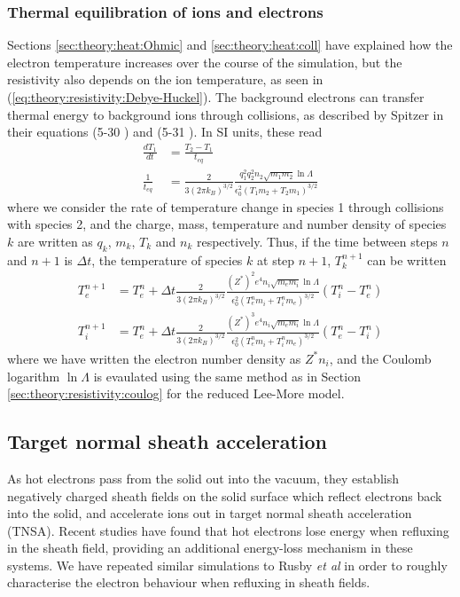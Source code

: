 \documentclass[12pt]{article}
\numberwithin{equation}{section}
\begin{document}
\subsubsection{Thermal equilibration of ions and electrons} \label{sec:theory:heat:ion}

Sections \ref{sec:theory:heat:Ohmic} and \ref{sec:theory:heat:coll} have explained how the electron temperature increases over the course of the simulation, but the resistivity also depends on the ion temperature, as seen in (\ref{eq:theory:resistivity:Debye-Huckel}). The background electrons can transfer thermal energy to background ions through collisions, as described by Spitzer \cite{theory:thermalEquil:Spitzer} in their equations (5-30 \cite{theory:thermalEquil:Spitzer}) and (5-31 \cite{theory:thermalEquil:Spitzer}). In SI units, these read
%
\begin{align}
  \frac{dT_1}{dt} &= \frac{T_2 - T_1}{t_{eq}}
  \\
  \frac{1}{t_{eq}} &= \frac{2}{3(2\pi k_B)^{3/2}}\frac{q_1^2q_2^2n_2\sqrt{m_1m_2}\ln\Lambda}{\epsilon_0^2(T_1m_2 + T_2m_1)^{3/2}}
\end{align}
%
where we consider the rate of temperature change in species 1 through collisions with species 2, and the charge, mass, temperature and number density of species $k$ are written as $q_k$, $m_k$, $T_k$ and $n_k$ respectively. Thus, if the time between steps $n$ and $n+1$ is $\Delta t$, the temperature of species $k$ at step $n+1$, $T_k^{n+1}$ can be written
%
\begin{align} \label{eq:ion_temp}
  T^{n+1}_e &= T_e^{n} + \Delta t \frac{2}{3(2\pi k_B)^{3/2}}\frac{(Z^*)^2e^4n_i\sqrt{m_em_i}\ln\Lambda}{\epsilon_0^2(T_e^nm_i + T_i^nm_e)^{3/2}}(T_i^{n} - T_e^{n}) \\
    T^{n+1}_i &= T_e^{n} + \Delta t \frac{2}{3(2\pi k_B)^{3/2}}\frac{(Z^*)^3e^4n_i\sqrt{m_em_i}\ln\Lambda}{\epsilon_0^2(T_e^nm_i + T_i^nm_e)^{3/2}}(T_e^{n} - T_i^{n})
\end{align}
%
where we have written the electron number density as $Z^*n_i$, and the Coulomb logarithm $\ln\Lambda$ is evaulated using the same method as in Section \ref{sec:theory:resistivity:coulog} for the reduced Lee-More model.

\subsection{Target normal sheath acceleration} \label{sec:theory:TNSA}

As hot electrons pass from the solid out into the vacuum, they establish negatively charged sheath fields on the solid surface which reflect electrons back into the solid, and accelerate ions out in target normal sheath acceleration (TNSA). Recent studies \cite{bremPIC:Vyskocil, TNSA:rusby} have found that hot electrons lose energy when refluxing in the sheath field, providing an additional energy-loss mechanism in these systems. We have repeated similar simulations to Rusby \textit{et al} \cite{TNSA:rusby} in order to roughly characterise the electron behaviour when refluxing in sheath fields.
\end{document}
